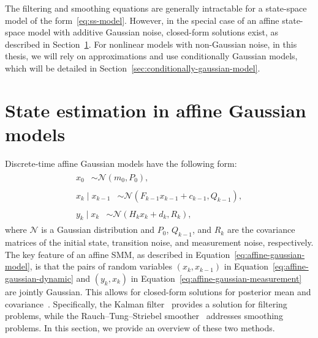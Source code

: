 \documentclass[dissertation,math,vertlayout,pdfa,colorlinks,nologo]{aaltoseries}
\begin{document}
%
The filtering and smoothing equations are generally intractable for a state-space model of the form~\eqref{eq:ss-model}. However, in the special case of an affine state-space model with additive Gaussian noise, closed-form solutions exist, as described in Section~\ref{sec:affine-gaussian-model}. For nonlinear models with non-Gaussian noise, in this thesis, we will rely on approximations and use conditionally Gaussian models, which will be detailed in  Section~\ref{sec:conditionally-gaussian-model}. 

\section{State estimation in affine Gaussian models}\label{sec:affine-gaussian-model}
Discrete-time affine Gaussian models have the following form:
\begin{subequations} \label{eq:affine-gaussian-model}
    \begin{align}
        \begin{split} \label{eq:affine-gaussian-x0}
            x_0 &\sim \mathcal{N}(m_0, P_0), 
        \end{split}\\
        \begin{split} \label{eq:affine-gaussian-dynamic}
            x_k \mid x_{k - 1} &\sim \mathcal{N}(F_{k-1} x_{k-1} + c_{k-1} , Q_{k-1}), 
        \end{split}\\
        \begin{split} \label{eq:affine-gaussian-measurement}
            y_k \mid x_k &\sim \mathcal{N}(H_k x_k + d_k,  R_k),
        \end{split}
\end{align}
\end{subequations}
where $\mathcal{N}$ is a Gaussian distribution and $P_0$, $Q_{k-1}$, and $R_k$ are the covariance matrices of the initial state, transition noise, and measurement noise, respectively. The key feature of an affine SMM, as described in Equation~\eqref{eq:affine-gaussian-model}, is that the pairs of random variables $(x_k, x_{k - 1})$ in Equation~\eqref{eq:affine-gaussian-dynamic} and $(y_k, x_k)$ in Equation~\eqref{eq:affine-gaussian-measurement} are jointly Gaussian. This allows for closed-form solutions for posterior mean and covariance~\citep[subsection 1.4.14]{bar2004estimation}. Specifically, the Kalman filter~\citep{kalman1960new} provides a solution for filtering problems, while the Rauch–Tung–Striebel smoother~\citep{rauch1965maximum} addresses smoothing problems. In this section, we provide an overview of these two methods.
%
\end{document}

